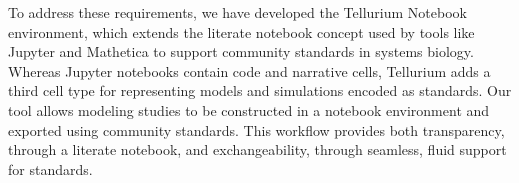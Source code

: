 \documentclass[10pt,letterpaper]{article}
\begin{document}
To address these requirements, we have developed the Tellurium Notebook environment, which extends the literate notebook concept used by tools like Jupyter \cite{ragan2014jupyter} and Mathetica \cite{wolfram1996mathematica} to support community standards in systems biology. Whereas Jupyter notebooks contain code and narrative cells, Tellurium adds a third cell type for representing models and simulations encoded as standards. Our tool allows modeling studies to be constructed in a notebook environment and exported using community standards. This workflow %
provides both transparency, through a literate notebook, and exchangeability, through seamless, fluid support for standards. %


\end{document}
